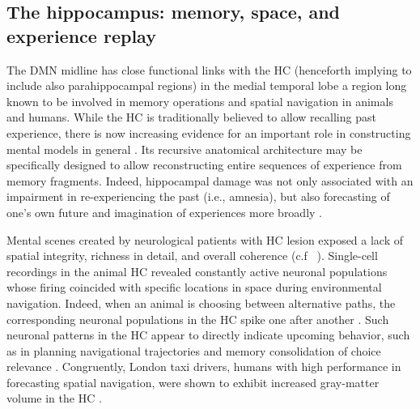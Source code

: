 \documentclass[10pt,letterpaper]{article}
\begin{document}
\subsection{The hippocampus: memory, space, and experience replay}
The DMN midline has close functional links
with the HC (henceforth implying to include also parahippocampal regions)
in the medial temporal lobe \citep{vincet2006, shannon2013morning} \textemdash
a region long known to be involved in
memory operations and spatial navigation in animals and humans.
While the HC
is traditionally believed to allow recalling past experience,
there is now increasing evidence for an important role
in constructing mental models in general
\citep{maguire2016, schacter2007remembering, gelbard2008internally, Javadi2017,
boyer2008evolutionary}.
Its recursive anatomical architecture
may be specifically designed to allow reconstructing
entire sequences of experience from memory fragments.
Indeed,
hippocampal damage was
not only associated with an impairment in re-experiencing the past (i.e., amnesia),
but also forecasting of one's own future and
imagination of experiences more broadly \citep{hassabis2007patients}.

Mental scenes created by neurological patients with HC lesion exposed a lack of
spatial integrity, richness in detail, and overall coherence (c.f ~\citep{hassabis2007patients}).
%
Single-cell recordings in the animal HC revealed
constantly active neuronal populations whose firing coincided with
specific locations in space during environmental navigation.
Indeed, when an animal is choosing between alternative
paths, the corresponding neuronal populations in the HC
spike one after another  \citep{johnson2007neural}.
Such neuronal patterns in the HC appear to directly indicate upcoming behavior,
such as in planning navigational trajectories
\citep{pfeiffer2013hippocampal} and
memory consolidation of choice relevance \citep{lavilleon2015}.
Congruently,
London taxi drivers, humans with high performance in forecasting spatial navigation,
were shown to exhibit increased gray-matter volume in the
HC \citep{maguire2000navigation}.
\end{document}
